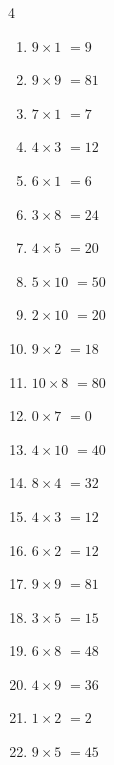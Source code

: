 \begin{multicols}{4}
\begin{enumerate}
  \item $9\times 1$
        $=9$

  \item $9\times 9$
        $=81$

  \item $7\times 1$
        $=7$

  \item $4\times 3$
        $=12$

  \item $6\times 1$
        $=6$

  \item $3\times 8$
        $=24$

  \item $4\times 5$
        $=20$

  \item $5\times 10$
        $=50$

  \item $2\times 10$
        $=20$

  \item $9\times 2$
        $=18$

  \item $10\times 8$
        $=80$

  \item $0\times 7$
        $=0$

  \item $4\times 10$
        $=40$

  \item $8\times 4$
        $=32$

  \item $4\times 3$
        $=12$

\columnbreak %

\resetques

  \item $6\times 2$
        $=12$

  \item $9\times 9$
        $=81$

  \item $3\times 5$
        $=15$

  \item $6\times 8$
        $=48$

  \item $4\times 9$
        $=36$

  \item $1\times 2$
        $=2$

  \item $9\times 5$
        $=45$


\end{enumerate}
\end{multicols}

